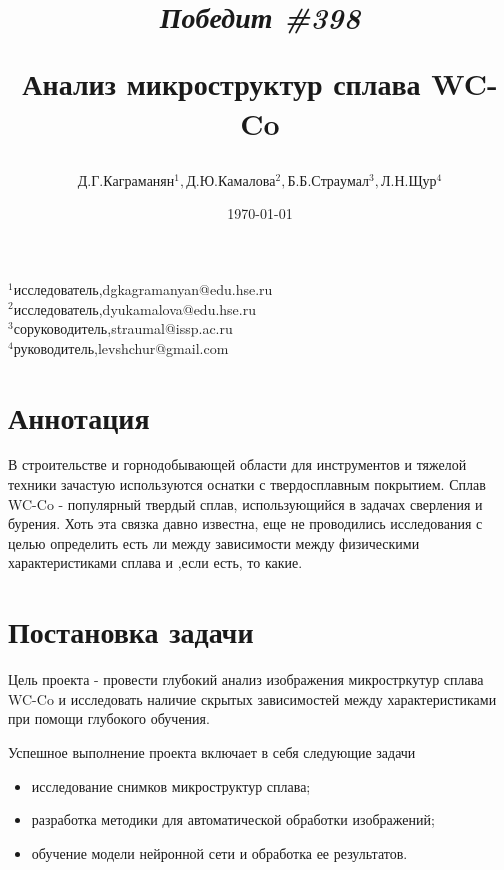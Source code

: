 \documentclass[a4paper, 14pt]{article}
\begin{document}
	\title{		\textbf{\textit{Победит \#398}} 
		
	Анализ микроструктур сплава WC-Co}

	\author{$ Д.Г. Каграманян^1, Д.Ю. Камалова^2, Б.Б. Страумал^3, Л.Н. Щур^4$}
	\date{\today}
	\maketitle

	\hfill
	\begin{minipage}{1\textwidth}
			\flushleft
	    $^1$исследователь,dgkagramanyan@edu.hse.ru\\
	    $^2$исследователь,dyukamalova@edu.hse.ru \\
	    $^3$соруководитель,straumal@issp.ac.ru\\
   	 	$^4$руководитель,levshchur@gmail.com\\



	\end{minipage}%

	\section{Аннотация}
	В строительстве и горнодобывающей области для инструментов и тяжелой техники зачастую используются оснатки  с твердосплавным покрытием. 
	Сплав WC-Co  - популярный твердый сплав, использующийся в задачах сверления и бурения. Хоть эта связка давно известна, еще не проводились исследования с целью определить есть ли между зависимости между физическими характеристиками сплава и ,если есть, то какие. 

	\section{Постановка задачи}
	Цель проекта - провести глубокий анализ изображения микростркутур сплава WC-Co и исследовать наличие скрытых зависимостей между характеристиками при помощи глубокого обучения. 
		
	Успешное выполнение проекта включает в себя следующие задачи
	\begin{itemize}
		\item исследование снимков микроструктур сплава;
		
		\item разработка методики для автоматической обработки изображений;
		
		\item обучение модели нейронной сети и обработка ее результатов.
	\end{itemize}
	
\end{document}
